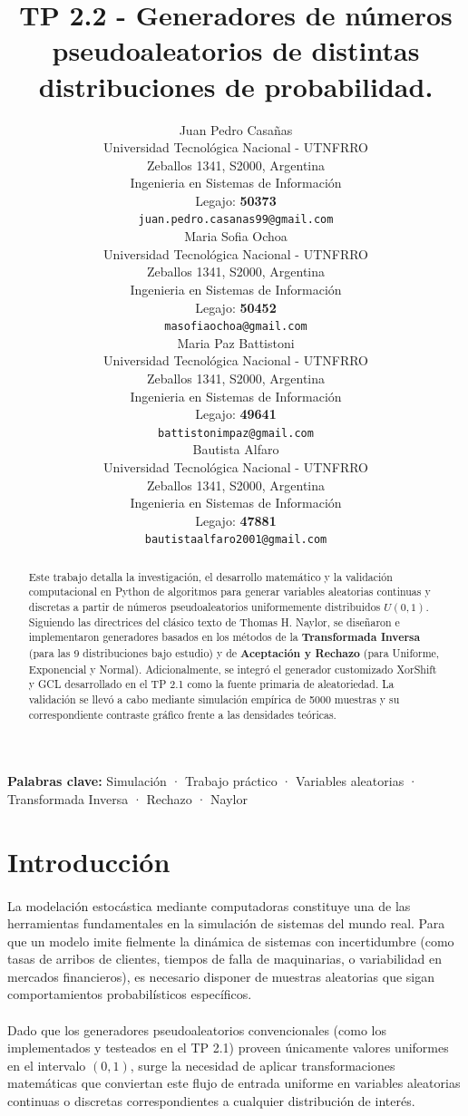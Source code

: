 \documentclass{article}
\title{TP 2.2 - Generadores de números pseudoaleatorios de distintas distribuciones de probabilidad.}
\author{
  Juan Pedro Casañas \\
  Universidad Tecnológica Nacional - UTNFRRO\\
  Zeballos 1341, S2000, Argentina\\
  Ingenieria en Sistemas de Información \\
  Legajo: \textbf{50373}\\
  \texttt{juan.pedro.casanas99@gmail.com} \\
   \And
  Maria Sofia Ochoa \\
  Universidad Tecnológica Nacional - UTNFRRO\\
  Zeballos 1341, S2000, Argentina\\
  Ingenieria en Sistemas de Información \\
  Legajo: \textbf{50452}\\
  \texttt{masofiaochoa@gmail.com} \\
  \And
  Maria Paz Battistoni \\
  Universidad Tecnológica Nacional - UTNFRRO\\
  Zeballos 1341, S2000, Argentina\\
  Ingenieria en Sistemas de Información \\
  Legajo: \textbf{49641}\\
  \texttt{battistonimpaz@gmail.com} \\
  \And
  Bautista Alfaro \\
  Universidad Tecnológica Nacional - UTNFRRO\\
  Zeballos 1341, S2000, Argentina\\
  Ingenieria en Sistemas de Información \\
  Legajo: \textbf{47881}\\
  \texttt{bautistaalfaro2001@gmail.com} \\
}
\begin{document}
\maketitle 

\pagestyle{fancy}
\fancyhf{}
\fancyhead[R]{\today}
\fancyfoot[C]{\thepage}

\begin{abstract} %
Este trabajo detalla la investigación, el desarrollo matemático y la validación computacional en Python de algoritmos para generar variables aleatorias continuas y discretas a partir de números pseudoaleatorios uniformemente distribuidos $U(0,1)$. Siguiendo las directrices del clásico texto de Thomas H. Naylor, se diseñaron e implementaron generadores basados en los métodos de la \textbf{Transformada Inversa} (para las 9 distribuciones bajo estudio) y de \textbf{Aceptación y Rechazo} (para Uniforme, Exponencial y Normal). Adicionalmente, se integró el generador customizado XorShift y GCL desarrollado en el TP 2.1 como la fuente primaria de aleatoriedad. La validación se llevó a cabo mediante simulación empírica de 5000 muestras y su correspondiente contraste gráfico frente a las densidades teóricas.
\end{abstract}

\noindent\textbf{Palabras clave: } Simulación · Trabajo práctico · Variables aleatorias · Transformada Inversa · Rechazo · Naylor

\newpage
\section{Introducción}
\paragraph{}
La modelación estocástica mediante computadoras constituye una de las herramientas fundamentales en la simulación de sistemas del mundo real. Para que un modelo imite fielmente la dinámica de sistemas con incertidumbre (como tasas de arribos de clientes, tiempos de falla de maquinarias, o variabilidad en mercados financieros), es necesario disponer de muestras aleatorias que sigan comportamientos probabilísticos específicos.

\paragraph{}
Dado que los generadores pseudoaleatorios convencionales (como los implementados y testeados en el TP 2.1) proveen únicamente valores uniformes en el intervalo $(0,1)$, surge la necesidad de aplicar transformaciones matemáticas que conviertan este flujo de entrada uniforme en variables aleatorias continuas o discretas correspondientes a cualquier distribución de interés.
\end{document}
